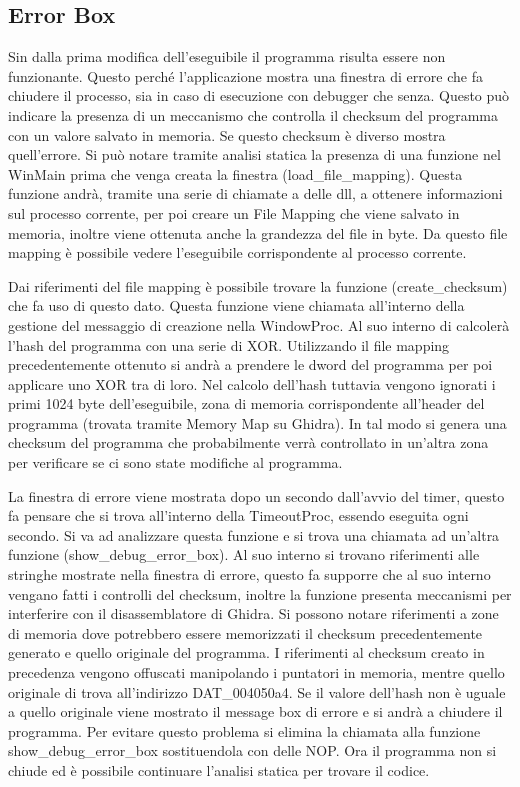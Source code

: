 \documentclass[a4paper,12pt]{article}
\begin{document}
\subsection{Error Box}
Sin dalla prima modifica dell'eseguibile il programma risulta essere non funzionante. Questo perché l'applicazione mostra una finestra di errore che fa chiudere il processo, sia in caso di esecuzione con debugger che senza.  Questo può indicare la presenza di un meccanismo che controlla il checksum del programma con un valore salvato in memoria. Se questo checksum è diverso mostra quell'errore. Si può notare tramite analisi statica la presenza di una funzione nel WinMain prima che venga creata la finestra (load\_file\_mapping). Questa funzione andrà, tramite una serie di chiamate a delle dll, a ottenere informazioni sul processo corrente, per poi creare un File Mapping che viene salvato in memoria, inoltre viene ottenuta anche la grandezza del file in byte. Da questo file mapping è possibile vedere l'eseguibile corrispondente al processo corrente.

Dai riferimenti del file mapping è possibile trovare la funzione (create\_checksum) che fa uso di questo dato. Questa funzione viene chiamata all'interno della gestione del messaggio di creazione nella WindowProc. 
Al suo interno di calcolerà l'hash del programma con una serie di XOR. Utilizzando il file mapping precedentemente ottenuto si andrà a prendere le dword del programma per poi applicare uno XOR tra di loro.  Nel calcolo dell'hash tuttavia vengono ignorati i primi 1024 byte dell'eseguibile, zona di memoria corrispondente all'header del programma (trovata tramite Memory Map su Ghidra).
In tal modo si genera una checksum del programma che probabilmente verrà controllato in un'altra zona per verificare se ci sono state modifiche al programma.  

La finestra di errore viene mostrata dopo un secondo dall'avvio del timer, questo fa pensare che si trova all'interno della TimeoutProc, essendo eseguita ogni secondo. Si va ad analizzare questa funzione e si trova una chiamata ad un'altra funzione (show\_debug\_error\_box). Al suo interno si trovano riferimenti alle stringhe mostrate nella finestra di errore, questo fa supporre che al suo interno vengano fatti i controlli del checksum, inoltre la funzione presenta meccanismi per interferire con il disassemblatore di Ghidra. 
Si possono notare riferimenti a zone di memoria  dove potrebbero essere memorizzati il checksum precedentemente generato e quello originale del programma. I riferimenti al checksum creato in precedenza vengono offuscati  manipolando i puntatori in memoria, mentre quello originale di trova all'indirizzo DAT\_004050a4. Se il valore dell'hash non è uguale a quello originale viene mostrato il message box di errore e si andrà a chiudere il programma. Per evitare questo problema si elimina la chiamata alla funzione show\_debug\_error\_box sostituendola con delle NOP. Ora il programma non si chiude ed è possibile continuare l'analisi statica per trovare il codice.
\end{document}
